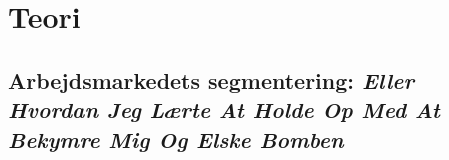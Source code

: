 

\part{Teori \label{part_teori}}




\chapter{Arbejdsmarkedets segmentering: \emph{Eller Hvordan Jeg Lærte At Holde Op Med At Bekymre Mig Og Elske Bomben }\label{kapitel_teori_AST}}








